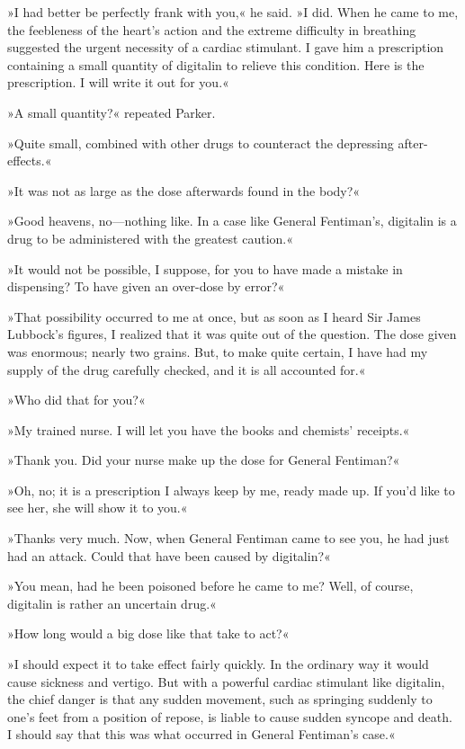 »I had better be perfectly frank with you,« he said. »I did. When he came to me, the feebleness of the heart's action and the extreme difficulty in breathing suggested the urgent necessity of a cardiac stimulant. I gave him a prescription containing a small quantity of digitalin to relieve this condition. Here is the prescription. I will write it out for you.«

»A small quantity?« repeated Parker.

»Quite small, combined with other drugs to counteract the depressing after-effects.«

»It was not as large as the dose afterwards found in the body?«

»Good heavens, no—nothing like. In a case like General Fentiman's, digitalin is a drug to be administered with the greatest caution.«

»It would not be possible, I suppose, for you to have made a mistake in dispensing? To have given an over-dose by error?«

»That possibility occurred to me at once, but as soon as I heard Sir James Lubbock's figures, I realized that it was quite out of the question. The dose given was enormous; nearly two grains. But, to make quite certain, I have had my supply of the drug carefully checked, and it is all accounted for.«

»Who did that for you?«

»My trained nurse. I will let you have the books and chemists' receipts.«

»Thank you. Did your nurse make up the dose for General Fentiman?«

»Oh, no; it is a prescription I always keep by me, ready made up. If you'd like to see her, she will show it to you.«

»Thanks very much. Now, when General Fentiman came to see you, he had just had an attack. Could that have been caused by digitalin?«

»You mean, had he been poisoned before he came to me? Well, of course, digitalin is rather an uncertain drug.«

»How long would a big dose like that take to act?«

»I should expect it to take effect fairly quickly. In the ordinary way it would cause sickness and vertigo. But with a powerful cardiac stimulant like digitalin, the chief danger is that any sudden movement, such as springing suddenly to one's feet from a position of repose, is liable to cause sudden syncope and death. I should say that this was what occurred in General Fentiman's case.«

